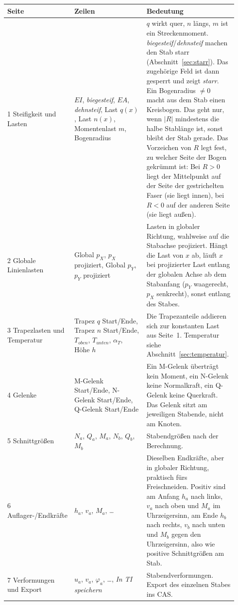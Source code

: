 \begin{longtable}{p{0.16\linewidth}p{0.38\linewidth}p{0.40\linewidth}}
  \toprule
  \textbf{Seite} & \textbf{Zeilen} & \textbf{Bedeutung} \\
  \midrule \endhead
  1 Steifigkeit und Lasten & $EI$, \emph{biegesteif}, $EA$, \emph{dehnsteif}, Last $q(x)$,
    Last $n(x)$, Momentenlast $m$, Bogenradius &
    $q$ wirkt quer, $n$ längs, $m$ ist ein Streckenmoment. \emph{biegesteif}/\emph{dehnsteif}
    machen den Stab starr (Abschnitt~\ref{sec:starr}). Das zugehörige Feld ist dann gesperrt und
    zeigt \emph{starr}. Ein Bogenradius $\ne 0$ macht aus dem Stab einen Kreisbogen. Das geht
    nur, wenn $|R|$ mindestens die halbe Stablänge ist, sonst bleibt der Stab gerade. Das
    Vorzeichen von $R$ legt fest, zu welcher Seite der Bogen gekrümmt ist: Bei $R > 0$ liegt der
    Mittelpunkt auf der Seite der gestrichelten Faser (sie liegt innen), bei $R < 0$ auf der
    anderen Seite (sie liegt außen). \\
  2 Globale Linienlasten & Global $p_X$, $p_X$ projiziert, Global $p_Y$, $p_Y$ projiziert &
    Lasten in globaler Richtung, wahlweise auf die Stabachse projiziert.
    Hängt die Last von $x$ ab, läuft $x$ bei projizierter Last entlang der globalen Achse ab dem
    Stabanfang ($p_Y$ waagerecht, $p_X$ senkrecht), sonst entlang des Stabes. \\
  3 Trapezlasten und Temperatur & Trapez $q$ Start/Ende, Trapez $n$ Start/Ende,
    $T_{oben}$, $T_{unten}$, $\alpha_T$, Höhe $h$ &
    Die Trapezanteile addieren sich zur konstanten Last aus Seite~1. Temperatur siehe
    Abschnitt~\ref{sec:temperatur}. \\
  4 Gelenke & M-Gelenk Start/Ende, N-Gelenk Start/Ende, Q-Gelenk Start/Ende &
    Ein M-Gelenk überträgt kein Moment, ein N-Gelenk keine Normalkraft, ein Q-Gelenk keine
    Querkraft. Das Gelenk sitzt am jeweiligen Stabende, nicht am Knoten. \\
  5 Schnittgrößen & $N_a$, $Q_a$, $M_a$, $N_b$, $Q_b$, $M_b$ & Stabendgrößen nach der Berechnung. \\
  6 Auflager-/Endkräfte & $h_a$, $v_a$, $M_a$, \dots & Dieselben Endkräfte, aber in globaler
    Richtung, praktisch fürs Freischneiden. Positiv sind am Anfang $h_a$ nach links, $v_a$ nach
    oben und $M_a$ im Uhrzeigersinn, am Ende $h_b$ nach rechts, $v_b$ nach unten und $M_b$ gegen
    den Uhrzeigersinn, also wie positive Schnittgrößen am Stab. \\
  7 Verformungen und Export & $u_a$, $v_a$, $\varphi_a$, \dots, \emph{In TI speichern} &
    Stabendverformungen. Export des einzelnen Stabes ins CAS. \\
  \bottomrule
\end{longtable}

